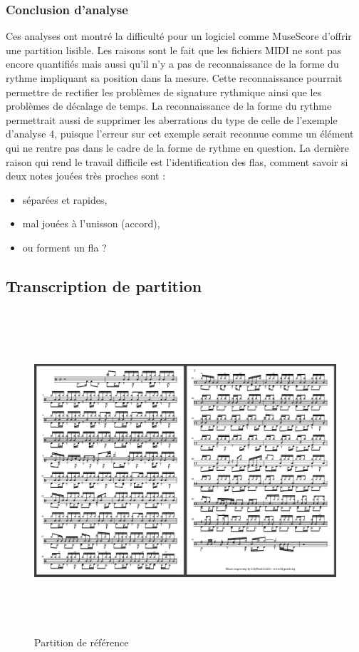\subsubsection{Conclusion d’analyse}
Ces analyses ont montré la difficulté pour un logiciel comme MuseScore d’offrir
une partition lisible. Les raisons sont le fait que les fichiers MIDI ne sont
pas encore quantifiés mais aussi qu’il n’y a pas de reconnaissance de la forme 
du rythme impliquant sa position dans la mesure. Cette reconnaissance pourrait
permettre de rectifier les problèmes de signature rythmique ainsi que les
problèmes de décalage de temps. La reconnaissance de la forme du rythme
permettrait aussi de supprimer les aberrations du type de celle de l’exemple
d’analyse 4, puisque l’erreur sur cet exemple serait reconnue comme un élément
qui ne rentre pas dans le cadre de la forme de rythme en question. La dernière
raison qui rend le travail difficile est l’identification des flas, comment
savoir si deux notes jouées très proches sont :
\begin{itemize}
    \item séparées et rapides,
    \item mal jouées à l’unisson (accord),
    \item ou forment un fla ?
\end{itemize}


\subsection*{Transcription de partition}
\label{partition_entiere}
\begin{figure}[h]
    \includegraphics[height=120mm, width=160mm]{
    z_images/4_experimentations/1_analyses/3_partition.png}
    \caption{Partition de référence}
	\label{partition_ref}
\end{figure}

